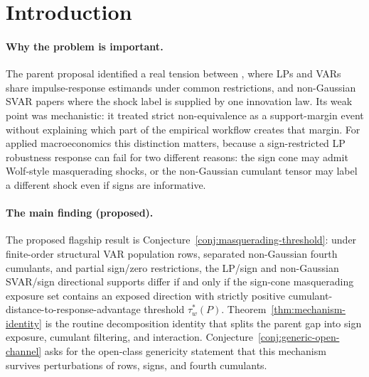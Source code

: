 \documentclass[11pt]{article}
\theoremstyle{definition}
\theoremstyle{plain}
\theoremstyle{remark}
\begin{document}
\begin{abstract}
This upgrade revisits the banked parent \texttt{eid\_lp\_svar\_nonequiv}/\texttt{v1}, whose proposed strict LP/sign versus non-Gaussian SVAR separation collapsed downstream into a single assumed margin.  The new mechanism question is whether that margin can be decomposed into a sign-cone masquerading channel, a fourth-cumulant labelling channel, and their interaction.  The flagship conjecture states that the LP/SVAR support gap is positive exactly when the sign restrictions expose at least one Wolf-style masquerading direction whose response advantage is bounded away from the cumulant-labelled SVAR orbit by a positive operational threshold \(\tau_w^*(P)\).  This is not a new LP/VAR finite-sample comparison: it is an exact-identification boundary for whether an LP sign-admissible shock can be interpreted as the same non-Gaussian structural shock.  If resolved, the result would give sign-restricted SVAR and LP users a named diagnostic that separates sign-pattern weakness from higher-moment labelling failure.
\end{abstract}

\section{Introduction}
\paragraph{Why the problem is important.}
The parent proposal identified a real tension between \citet{PlagborgMollerWolf2021}, where LPs and VARs share impulse-response estimands under common restrictions, and non-Gaussian SVAR papers where the shock label is supplied by one innovation law.  Its weak point was mechanistic: it treated strict non-equivalence as a support-margin event without explaining which part of the empirical workflow creates that margin.  For applied macroeconomics this distinction matters, because a sign-restricted LP robustness response can fail for two different reasons: the sign cone may admit Wolf-style masquerading shocks, or the non-Gaussian cumulant tensor may label a different shock even if signs are informative.

\paragraph{The main finding (proposed).}
The proposed flagship result is Conjecture~\ref{conj:masquerading-threshold}: under finite-order structural VAR population rows, separated non-Gaussian fourth cumulants, and partial sign/zero restrictions, the LP/sign and non-Gaussian SVAR/sign directional supports differ if and only if the sign-cone masquerading exposure set contains an exposed direction with strictly positive cumulant-distance-to-response-advantage threshold \(\tau_w^*(P)\).  Theorem~\ref{thm:mechanism-identity} is the routine decomposition identity that splits the parent gap into sign exposure, cumulant filtering, and interaction.  Conjecture~\ref{conj:generic-open-channel} asks for the open-class genericity statement that this mechanism survives perturbations of rows, signs, and fourth cumulants.
\end{document}
